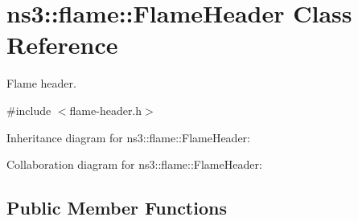 \hypertarget{classns3_1_1flame_1_1FlameHeader}{}\section{ns3\+:\+:flame\+:\+:Flame\+Header Class Reference}
\label{classns3_1_1flame_1_1FlameHeader}


Flame header.  




{\ttfamily \#include $<$flame-\/header.\+h$>$}



Inheritance diagram for ns3\+:\+:flame\+:\+:Flame\+Header\+:


Collaboration diagram for ns3\+:\+:flame\+:\+:Flame\+Header\+:
\subsection*{Public Member Functions}
